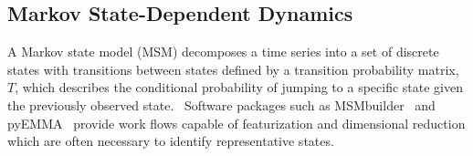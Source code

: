 \documentclass{article}
\begin{document}




  \subsection{Markov State-Dependent Dynamics}\label{method:MSMs}  

  A Markov state model (MSM) decomposes a time series into a set of discrete states
  with transitions between states defined by a transition probability matrix, $T$,
  which describes the conditional probability of jumping to a specific state given
  the previously observed state.~\cite{pande_everything_2010,wehmeyer_introduction_2018}
  Software packages such as MSMbuilder~\cite{beauchamp_msmbuilder2:_2011} and 
  pyEMMA~\cite{scherer_pyemma_2015} provide work flows capable of featurization and
  dimensional reduction which are often necessary to identify representative states.
\end{document}
